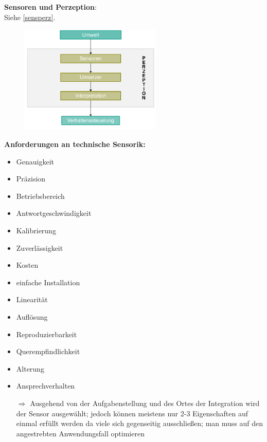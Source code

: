 \textbf{Sensoren und Perzeption}:\\
Siehe \autoref{sensperz}.
\begin{figure}[h!]
	\centering
	\includegraphics[width=0.6\textwidth]{figures/ch04_sensperz.png}
	\caption{}
	\label{sensperz}
\end{figure}
\newpage
\textbf{Anforderungen an technische Sensorik:}
\begin{itemize}
\setlength\itemsep{0em}
\item Genauigkeit 
\item Präzision 
\item Betriebsbereich 
\item Antwortgeschwindigkeit 
\item Kalibrierung 
\item Zuverlässigkeit 
\item Kosten
\item einfache Installation
\item Linearität
\item Auflösung
\item Reproduzierbarkeit
\item Querempfindlichkeit
\item Alterung
\item Ansprechverhalten
\item[$\Rightarrow$] Ausgehend von der Aufgabenstellung und des Ortes der Integration wird der Sensor ausgewählt; jedoch können meistens nur 2-3 Eigenschaften auf einmal erfüllt werden da viele sich gegenseitig ausschließen; man muss auf den angestrebten Anwendungsfall optimieren
\end{itemize}

